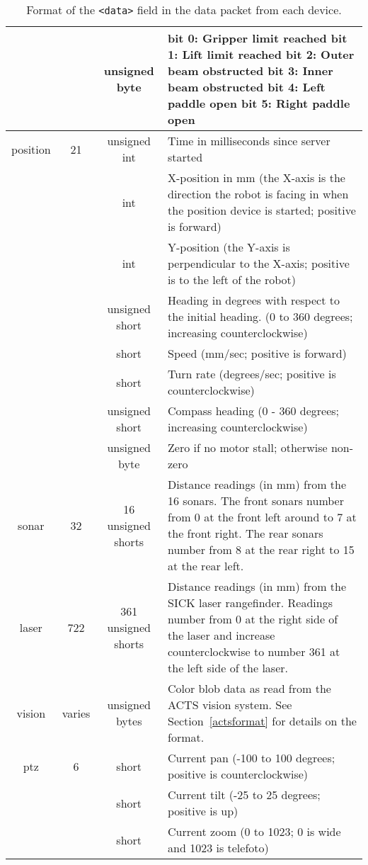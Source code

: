 \documentclass[11pt]{article}
\begin{document}
\begin{table}
\begin{center}
{\begin{tabularx}{\columnwidth}{|c|c|c|X|}
& & unsigned byte & bit 0: Gripper limit reached\newline
bit 1: Lift limit reached\newline
bit 2: Outer beam obstructed\newline
bit 3: Inner beam obstructed\newline
bit 4: Left paddle open\newline
bit 5: Right paddle open\\
\hline
position & 21 & unsigned int & Time in milliseconds since server started \\
 & & int & X-position in mm (the X-axis is the direction 
the robot is facing in when the position device is started; positive is
forward) \\
 & & int & Y-position (the Y-axis is perpendicular to the X-axis;
positive is to the left of the robot)\\
 & & unsigned short & Heading in degrees with respect to the initial heading.
(0 to 360 degrees; increasing counterclockwise)\\
 & & short & Speed (mm/sec; positive is forward) \\
& & short & Turn rate (degrees/sec; positive is counterclockwise)\\
& & unsigned short & Compass heading (0 - 360 degrees; increasing counterclockwise) \\
& & unsigned byte & Zero if no motor stall; otherwise non-zero \\
\hline
sonar & 32 & 16 unsigned shorts & Distance readings (in mm) from the 16 sonars.  The
front sonars number from 0 at the front left around to 7 at the front right.
The rear sonars number from 8 at the rear right to 15 at the rear left.\\
\hline
laser & 722 & 361 unsigned shorts & Distance readings (in mm) from the SICK laser rangefinder.  Readings number from 0 at the right side of the laser and increase 
counterclockwise to number 361 at the left side of the laser. \\
\hline
vision & varies & unsigned bytes & Color blob data as read from the ACTS
vision system.  See Section~\ref{actsformat} for details on the format. \\
\hline
ptz & 6 & short & Current pan (-100 to 100 degrees; positive is counterclockwise) \\
& & short & Current tilt (-25 to 25 degrees; positive is up) \\
& & short & Current zoom (0  to 1023; 0 is wide and 1023 is telefoto) \\
\hline
\end{tabularx}
}
\end{center}

\caption{Format of the {\tt <data>} field in the data packet from each device.}
\label{dataformat}
\end{table}
\end{document}
